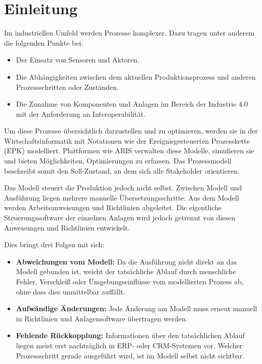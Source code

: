 \chapter{Einleitung}
\label{einleitung}

Im industriellen Umfeld werden Prozesse komplexer. Dazu tragen unter anderem die folgenden 
Punkte bei:

\begin{itemize}
  \item Der Einsatz von Sensoren und Aktoren.
  \item Die Abhängigkeiten zwischen dem aktuellen Produktionsprozess und anderen Prozessschritten oder Zuständen.
  \item Die Zunahme von Komponenten und Anlagen im Bereich der Industrie 4.0 mit der Anforderung an Interoperabilität.
\end{itemize}

\noindent Um diese Prozesse übersichtlich darzustellen und zu optimieren, werden sie in der
Wirtschaftsinformatik mit Notationen wie der Ereignisgesteuerten Prozesskette (\acs{EPK}) modelliert.
Plattformen wie ARIS verwalten diese Modelle, simulieren sie und bieten Möglichkeiten, Optimierungen zu 
erfassen. Das Prozessmodell beschreibt somit den Soll-Zustand, an dem sich alle Stakeholder orientieren.

\noindent Das Modell steuert die Produktion jedoch nicht selbst. Zwischen Modell und Ausführung liegen mehrere manuelle 
Übersetzungsschritte: Aus dem Modell werden Arbeitsanweisungen und Richtlinien abgeleitet. Die 
eigentliche Steuerungssoftware der einzelnen Anlagen wird jedoch getrennt von diesen Anweisungen und Richtlinien entwickelt. \cite{mcginnis_formalizing_2019} \cite{venturamartins_applying_2017}

\noindent Dies bringt drei Folgen mit sich:

\begin{itemize}
  \item \textbf{Abweichungen vom Modell:} Da die Ausführung nicht direkt an das Modell gebunden ist, 
  weicht der tatsächliche Ablauf durch menschliche Fehler, Verschleiß oder Umgebungseinflüsse vom modellierten 
  Prozess ab, ohne dass dies unmittelbar auffällt. \cite{van_der_aalst_replaying_2012} \cite{dumas_grundlagen_2021}

  \item \textbf{Aufwändige Änderungen:} Jede Änderung am Modell muss erneut manuell in Richtlinien und Anlagensoftware
  übertragen werden. \cite{vanderaalst_business_2016} \cite{machado2022bridging}

  \item \textbf{Fehlende Rückkopplung:} Informationen über den tatsächlichen Ablauf liegen meist erst nachträglich in \acs{ERP}- oder \acs{CRM}-Systemen
  vor. Welcher Prozessschritt gerade ausgeführt wird, ist im Modell selbst nicht sichtbar. \cite{bundela_integration_2026} \cite{singh_eventdriven_2025}
\end{itemize} 

